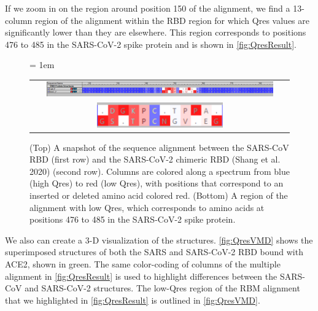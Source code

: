 If we zoom in on the region around position 150 of the alignment, we find a 13-column region of the alignment within the RBD region for which Qres values are significantly lower than they are elsewhere. This region corresponds to positions 476 to 485 in the SARS-CoV-2 spike protein and is shown in \autoref{fig:QresResult}.

\begin{figure}[h]
	\centering
	\tabcolsep = 1em
	\mySfFamily
	\begin{tabular}{c}
		\includegraphics[width = 0.9\textwidth]{../images/QresResult.png} \\
		\includegraphics[width = 0.5\textwidth]{../images/QresResult_cropped.png} \\
	\end{tabular}
	\caption{(Top) A snapshot of the sequence alignment between the SARS-CoV RBD (first row) and the SARS-CoV-2 chimeric RBD (Shang et al. 2020) (second row). Columns are colored along a spectrum from blue (high Qres) to red (low Qres), with positions that correspond to an inserted or deleted amino acid colored red. (Bottom) A region of the alignment with low Qres, which corresponds to amino acids at positions 476 to 485 in the SARS-CoV-2 spike protein.}
	\label{fig:QresResult}
\end{figure}

We also can create a 3-D visualization of the structures. \autoref{fig:QresVMD} shows the superimposed structures of both the SARS and SARS-CoV-2 RBD bound with ACE2, shown in green. The same color-coding of columns of the multiple alignment in \autoref{fig:QresResult} is used to highlight differences between the SARS-CoV and SARS-CoV-2 structures. The low-Qres region of the RBM alignment that we highlighted in \autoref{fig:QresResult} is outlined in \autoref{fig:QresVMD}.

